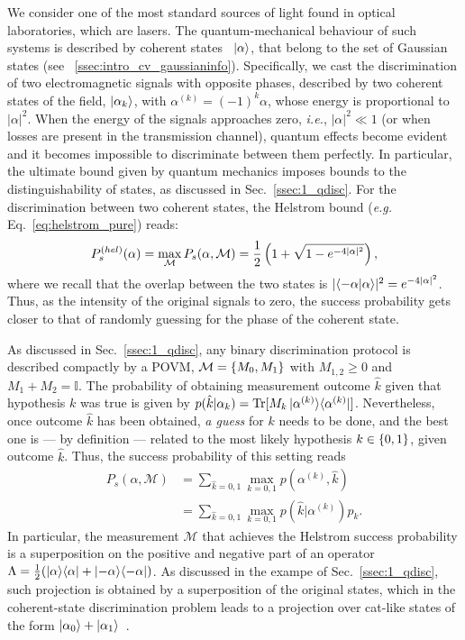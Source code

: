 We consider one of the most standard sources of light found in optical laboratories, which are lasers. The quantum-mechanical behaviour of such systems is described by coherent states~\cite{Glauber1963Coherent} $\ket{\alpha}$, that belong to the set of Gaussian states (see ~\ref{ssec:intro_cv_gaussianinfo}). Specifically, we cast the discrimination of two electromagnetic signals with opposite phases, described by two coherent states of the field, $\ket{\alpha_k}$, with $\alpha^{(k)} = (-1)^{k}\alpha$, whose energy is proportional to $|\alpha|^{2}$.
When the energy of the signals approaches zero, \textit{i.e.}, $|\alpha|^{2}\ll1$ (or when losses are present in the transmission channel), quantum effects become evident and it becomes impossible to discriminate between them perfectly. In particular, the ultimate bound given by quantum mechanics imposes bounds to the distinguishability of states, as discussed in Sec.~\ref{ssec:1_qdisc}. For the discrimination between two coherent states, the Helstrom bound (\textit{e.g.} Eq.~\eqref{eq:helstrom_pure}) reads:
\begin{align}\label{eq:hel_coh}
P_{s}^{(hel)}(\alpha)=\max_{\mathcal{M}}P_{s}(\alpha,\mathcal{M})=\frac12\left(1+\sqrt{1-e^{-4\lvert\alpha\rvert^{2}}}\right),
\end{align}
where we recall that the overlap between the two states is $|\langle -\alpha | \alpha \rangle|^2 = e^{-4|\alpha|^2}$. Thus, as the intensity of the original signals to zero, the success probability gets closer to that of randomly guessing for the phase of the coherent state.

As discussed in Sec.~\ref{ssec:1_qdisc}, any binary discrimination protocol is described compactly by a POVM, $\mathcal{M}=\lbrace M_{0},M_{1}\rbrace$ with $M_{1,2}\geq0$ and $M_{1}+M_{2}=\mathbb{I}$. The probability of obtaining measurement outcome $\hat{k}$ given that hypothesis $k$ was true is given by $p(\hat{k}|\alpha_k) = \tr{M_k \proj{\alpha^{(k)}}}$.
Nevertheless, once outcome $\hat{k}$ has been obtained, \textit{a guess} for $k$ needs to be done, and the best one is --- by definition ---  related to the most likely hypothesis $k\in\lbrace 0,1\rbrace$, given outcome $\hat{k}$. Thus, the success probability of this setting reads
\begin{align}
P_{s}(\alpha,\mathcal{M})&=\sum_{\hat{k}=0,1}\max_{k=0,1}p(\alpha^{(k)},\hat{k})\\
&=\sum_{\hat{k}=0,1}\max_{k=0,1}p(\hat{k}|\alpha^{(k)})p_{k}.
\end{align}
In particular, the measurement $\mathcal{M}$ that achieves the Helstrom success probability is a superposition on the positive and negative part of an operator $\Lambda = \frac{1}{2}(\proj{\alpha} + \proj{-\alpha})$. As discussed in the exampe of Sec.~\ref{ssec:1_qdisc}, such projection is obtained by a superposition of the original states, which in the coherent-state discrimination problem leads to a projection over cat-like states of the form $\ket{\alpha_0} + \ket{\alpha_1}$~\cite{Osaki1996Derivation}.

